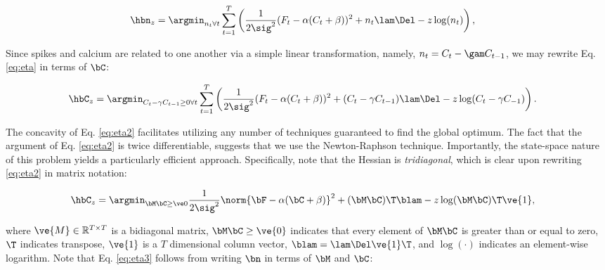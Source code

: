 \begin{align} \label{eq:eta}
\hbn_{\zzz} &= \argmin_{n_t \forall t}  \sum_{t=1}^T \left( \frac{1}{2 \sig^2}(F_t - \alpha(C_t + \beta))^2  +  n_t  \lam \Del - \zzz \log(n_t) \right),
\end{align}

Since spikes and calcium are related to one another via a simple linear transformation, namely, $n_t= C_t-\gam C_{t-1}$, we may rewrite Eq. \eqref{eq:eta} in terms of $\bC$:

\begin{align} 
\hbC_{\zzz} &= \argmin_{C_t - \gamma C_{t-1} \geq 0 \forall t} \sum_{t=1}^{T} \left( \frac{1}{2 \sig^2} (F_t -\alpha (C_t + \beta))^2  + (C_t - \gamma C_{t-1}) \lam \Del - \zzz \log(C_t - \gamma C_{-1}) \right). \label{eq:eta2}
\end{align}

\noindent The concavity of Eq. \eqref{eq:eta2} facilitates utilizing any number of techniques guaranteed to find the global optimum.  The fact that the argument of Eq. \eqref{eq:eta2} is twice differentiable, suggests that we use the Newton-Raphson technique. Importantly, the state-space nature of this problem yields a particularly efficient approach. Specifically, note that the Hessian is \emph{tridiagonal}, which is clear upon rewriting \eqref{eq:eta2} in matrix notation:

\begin{align} 
\hbC_{\zzz} %
&= \az  \frac{1}{2 \sig^2} \norm{\bF - \alpha (\bC +\beta)}^2 + (\bM \bC )\T \blam  - \zzz \log(\bM \bC)\T\ve{1},  \label{eq:eta3}
\end{align}

\noindent where $\ve{M} \in \mathbb{R}^{T \times T}$ is a bidiagonal matrix, $\bM \bC \geq \ve{0}$ indicates that every element of $\bM \bC$ is greater than or equal to zero, $\T$ indicates transpose, $\ve{1}$ is a $T$ dimensional column vector, $\blam=\lam \Del \ve{1}\T$, and $\log(\cdot)$ indicates an element-wise logarithm.  Note that Eq. \eqref{eq:eta3} follows from writing $\bn$ in terms of $\bM$ and $\bC$:
 

